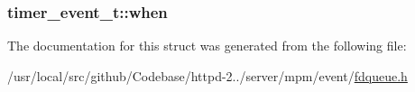 \subsubsection[{\texorpdfstring{when}{when}}]{ timer\+\_\+event\+\_\+t\+::when}\hypertarget{structtimer__event__t_a37ec17770ee31fcde7dfd8e81e214903}{}\label{structtimer__event__t_a37ec17770ee31fcde7dfd8e81e214903}


The documentation for this struct was generated from the following file\+:\begin{DoxyCompactItemize}
\item 
/usr/local/src/github/\+Codebase/httpd-\/2../server/mpm/event/\hyperlink{event_2fdqueue_8h}{fdqueue.\+h}\end{DoxyCompactItemize}
